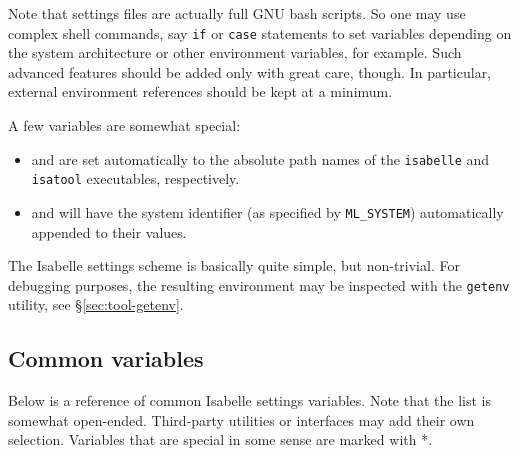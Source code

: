 Note that settings files are actually full GNU bash scripts. So one
may use complex shell commands, say \texttt{if} or \texttt{case}
statements to set variables depending on the system architecture or
other environment variables, for example. Such advanced features
should be added only with great care, though. In particular, external
environment references should be kept at a minimum.

\medskip A few variables are somewhat special:
\begin{itemize}
\item {} and  are set automatically to
  the absolute path names of the \texttt{isabelle} and
  \texttt{isatool} executables, respectively.
  
\item {} and  will have
  the {\ML} system identifier (as specified by \texttt{ML_SYSTEM})
  automatically appended to their values.
\end{itemize}

\medskip The Isabelle settings scheme is basically quite simple, but
non-trivial.  For debugging purposes, the resulting environment may be
inspected with the \texttt{getenv} utility, see
\S\ref{sec:tool-getenv}.


\subsection{Common variables}

Below is a reference of common Isabelle settings variables. Note that
the list is somewhat open-ended. Third-party utilities or interfaces
may add their own selection. Variables that are special in some sense
are marked with *.

